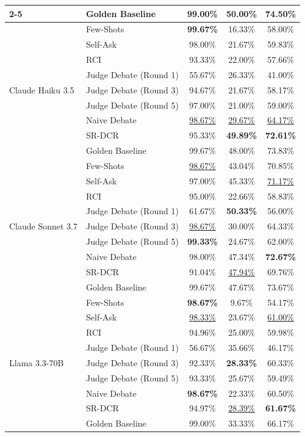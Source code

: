 \documentclass[11pt]{article}
\begin{document}
\begin{table}[!t]
{\begin{tabular}{llccc}
    \cmidrule(lr){2-5}
    & Golden Baseline & 99.00\% & 50.00\% & 74.50\% \\
    \midrule
    \multirow{9}{*}{Claude Haiku 3.5}
    & Few-Shots & \textbf{99.67\%} & 16.33\% & 58.00\% \\
    & Self-Ask & 98.00\% & 21.67\% & 59.83\% \\
    & RCI & 93.33\% & 22.00\% & 57.66\% \\
    & Judge Debate (Round 1) & 55.67\% & 26.33\% & 41.00\% \\
    & Judge Debate (Round 3) & 94.67\% & 21.67\% & 58.17\% \\
    & Judge Debate (Round 5) & 97.00\% & 21.00\% & 59.00\% \\
    & Naive Debate & \underline{98.67\%} & \underline{29.67\%} & \underline{64.17\%} \\
    & SR-DCR & 95.33\% & \textbf{49.89\%} & \textbf{72.61\%} \\
    \cmidrule(lr){2-5}
    & Golden Baseline & 99.67\% & 48.00\% & 73.83\% \\
    \midrule
    \multirow{9}{*}{Claude Sonnet 3.7}
    & Few-Shots & \underline{98.67\%} & 43.04\% & 70.85\% \\
    & Self-Ask & 97.00\% & 45.33\% & \underline{71.17\%} \\
    & RCI & 95.00\% & 22.66\% & 58.83\% \\
    & Judge Debate (Round 1) & 61.67\% & \textbf{50.33\%} & 56.00\% \\
    & Judge Debate (Round 3) & \underline{98.67\%} & 30.00\% & 64.33\% \\
    & Judge Debate (Round 5) & \textbf{99.33\%} & 24.67\% & 62.00\% \\
    & Naive Debate & 98.00\% & 47.34\% & \textbf{72.67\%} \\
    & SR-DCR & 91.04\% & \underline{47.94\%} & 69.76\% \\
    \cmidrule(lr){2-5}
    & Golden Baseline & 99.67\% & 47.67\% & 73.67\% \\
    \midrule
    \multirow{9}{*}{Llama 3.3-70B}
    & Few-Shots & \textbf{98.67\%} & 9.67\% & 54.17\% \\
    & Self-Ask & \underline{98.33\%} & 23.67\% & \underline{61.00\%} \\
    & RCI & 94.96\% & 25.00\% & 59.98\% \\
    & Judge Debate (Round 1) & 56.67\% & 35.66\% & 46.17\% \\
    & Judge Debate (Round 3) & 92.33\% & \textbf{28.33\%} & 60.33\% \\
    & Judge Debate (Round 5) & 93.33\% & 25.67\% & 59.49\% \\
    & Naive Debate & \textbf{98.67\%} & 22.33\% & 60.50\% \\
    & SR-DCR & 94.97\% & \underline{28.39\%} & \textbf{61.67\%} \\
    \cmidrule(lr){2-5}
    & Golden Baseline & 99.00\% & 33.33\% & 66.17\% \\
    \bottomrule
  \end{tabular}
  }
  \vspace{-0.5em}
\end{table}
\end{document}
